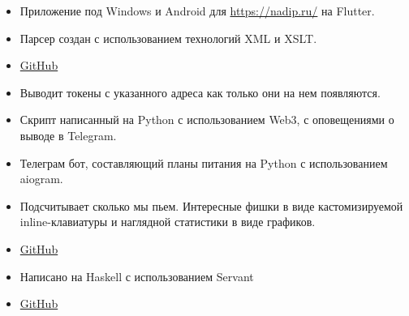 \documentclass[10pt,a4paper,ragged2e]{altacv}
\begin{document}
\begin{itemize}
\item Приложение под Windows и Android для \newline \url{https://nadip.ru/} на Flutter.
\end{itemize}
\smallskip
{}
\begin{itemize}
\item Парсер создан с использованием технологий XML и XSLT.
\item \href{https://github.com/YeslieSnayder/eo}{GitHub}
\end{itemize}
\smallskip
{}
\begin{itemize}
\item Выводит токены с указанного адреса как только они на нем появляются.
\item Скрипт написанный на Python с использованием Web3, с оповещениями о выводе в Telegram.
\end{itemize}
\smallskip
{}
\begin{itemize}
\item Телеграм бот, составляющий планы питания на Python с использованием aiogram.
\end{itemize}
\smallskip
{}
\begin{itemize}
\item Подсчитывает сколько мы пьем. Интересные фишки в виде кастомизируемой inline-клавиатуры и наглядной статистики в виде графиков.
\item \href{https://github.com/sl1depengwyn/drink-bot}{GitHub}
\end{itemize}
\smallskip
{}
\begin{itemize}
\item Написано на Haskell с использованием Servant
\item \href{https://github.com/sl1depengwyn/drink-bot-api}{GitHub}
\end{itemize}
\smallskip
{}
\end{document}
